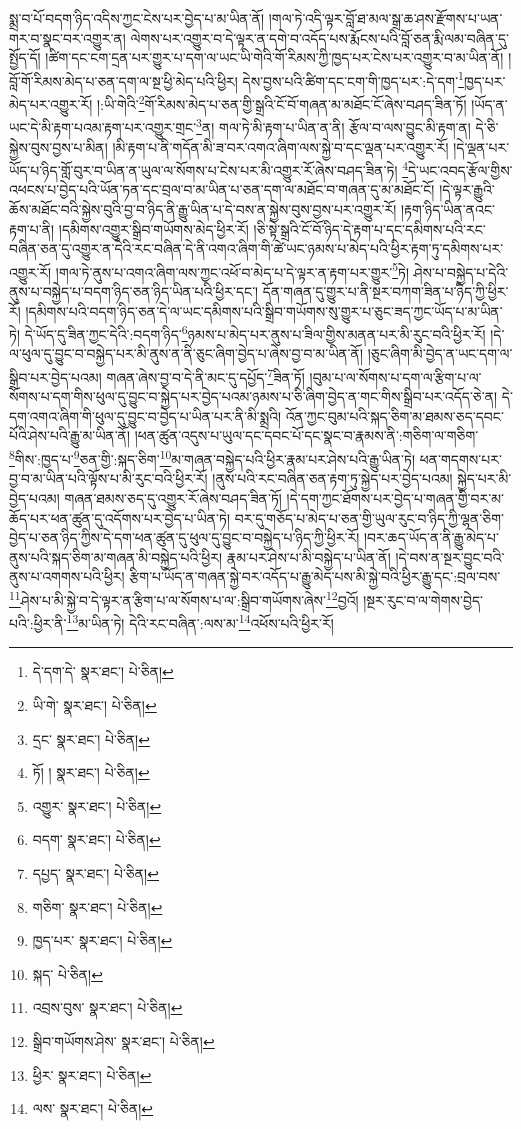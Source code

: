 སྨྲ་བ་པོ་བདག་ཉིད་འདིས་ཀྱང་ངེས་པར་བྱེད་པ་མ་ཡིན་ནོ། །གལ་ཏེ་འདི་ལྟར་བློ་ཐ་མལ་སྒྲ་ཆ་ཤས་རྫོགས་པ་ཡན་གར་བ་སྣང་བར་འགྱུར་ན། ལེགས་པར་འགྱུར་བ་དེ་ལྟར་ན་དགེ་བ་འདོད་པས་རྨོངས་པའི་བློ་ཅན་རྨི་ལམ་བཞིན་དུ་སྤྱོད་དོ། །ཚིག་དང་ངག་དྲན་པར་གྱུར་པ་དག་ལ་ཡང་ཡི་གེའི་གོ་རིམས་ཀྱི་ཁྱད་པར་ངེས་པར་འགྱུར་བ་མ་ཡིན་ནོ། །བློ་གོ་རིམས་མེད་པ་ཅན་དག་ལ་སྔ་ཕྱི་མེད་པའི་ཕྱིར། དེས་བྱས་པའི་ཚིག་དང་ངག་གི་ཁྱད་པར་:དེ་དག་\footnote{དེ་དག་དེ་  སྣར་ཐང་།  པེ་ཅིན། }ཁྱད་པར་མེད་པར་འགྱུར་རོ། །:ཡི་གེའི་\footnote{ཡི་གེ་  སྣར་ཐང་།  པེ་ཅིན། }གོ་རིམས་མེད་པ་ཅན་གྱི་སྒྲའི་ངོ་བོ་གཞན་མ་མཐོང་ངོ་ཞེས་བཤད་ཟིན་ཏོ། །ཡོད་ན་ཡང་དེ་མི་རྟག་པའམ་རྟག་པར་འགྱུར་གྲང་\footnote{དྲང་  སྣར་ཐང་།  པེ་ཅིན། }ན། གལ་ཏེ་མི་རྟག་པ་ཡིན་ན་ནི། རྩོལ་བ་ལས་བྱུང་མི་རྟག་ན། དེ་ཅི་སྐྱེས་བུས་བྱས་པ་མིན། །མི་རྟག་པ་ནི་གདོན་མི་ཟ་བར་འགའ་ཞིག་ལས་སྐྱེ་བ་དང་ལྡན་པར་འགྱུར་རོ། །དེ་ལྡན་པར་ཡོད་པ་ཉིད་གློ་བུར་བ་ཡིན་ན་ཡུལ་ལ་སོགས་པ་ངེས་པར་མི་འགྱུར་རོ་ཞེས་བཤད་ཟིན་ཏེ། \footnote{ཏོ། །   སྣར་ཐང་།  པེ་ཅིན། }དེ་ཡང་འབད་རྩོལ་གྱིས་འཕངས་པ་བྱེད་པའི་ཡོན་ཏན་དང་བྲལ་བ་མ་ཡིན་པ་ཅན་དག་ལ་མཐོང་བ་གཞན་དུ་མ་མཐོང་ངོ། །དེ་ལྟར་རྒྱུའི་ཆོས་མཐོང་བའི་སྐྱེས་བུའི་བྱ་བ་ཉིད་ནི་རྒྱུ་ཡིན་པ་དེ་བས་ན་སྐྱེས་བུས་བྱས་པར་འགྱུར་རོ། །རྟག་ཉིད་ཡིན་ནའང་རྟག་པ་ནི། །དམིགས་འགྱུར་སྒྲིབ་གཡོགས་མེད་ཕྱིར་རོ། །ཅི་སྟེ་སྒྲའི་ངོ་བོ་ཉིད་དེ་རྟག་པ་དང་དམིགས་པའི་རང་བཞིན་ཅན་དུ་འགྱུར་ན་དེའི་རང་བཞིན་དེ་ནི་འགའ་ཞིག་གི་ཚེ་ཡང་ཉམས་པ་མེད་པའི་ཕྱིར་རྟག་ཏུ་དམིགས་པར་འགྱུར་རོ། །གལ་ཏེ་ནུས་པ་འགའ་ཞིག་ལས་ཀྱང་འཕོ་བ་མེད་པ་དེ་ལྟར་ན་རྟག་པར་གྱུར་\footnote{འགྱུར་  སྣར་ཐང་།  པེ་ཅིན། }ཏེ། ཤེས་པ་བསྐྱེད་པ་དེའི་ནུས་པ་བསྐྱེད་པ་བདག་ཉིད་ཅན་ཉིད་ཡིན་པའི་ཕྱིར་དང་། དོན་གཞན་དུ་གྱུར་པ་ནི་སྔར་བཀག་ཟིན་པ་ཉིད་ཀྱི་ཕྱིར་རོ། །དམིགས་པའི་བདག་ཉིད་ཅན་དེ་ལ་ཡང་དམིགས་པའི་སྒྲིབ་གཡོགས་སུ་གྱུར་པ་ཅུང་ཟད་ཀྱང་ཡོད་པ་མ་ཡིན་ཏེ། དེ་ཡོད་དུ་ཟིན་ཀྱང་དེའི་:བདག་ཉིད་\footnote{བདག་  སྣར་ཐང་།  པེ་ཅིན། }ཉམས་པ་མེད་པར་ནུས་པ་ཟིལ་གྱིས་མནན་པར་མི་རུང་བའི་ཕྱིར་རོ། །དེ་ལ་ཕུལ་དུ་བྱུང་བ་བསྐྱེད་པར་མི་ནུས་ན་ནི་ཅུང་ཞིག་བྱེད་པ་ཞེས་བྱ་བ་མ་ཡིན་ནོ། །ཅུང་ཞིག་མི་བྱེད་ན་ཡང་དག་ལ་སྒྲིབ་པར་བྱེད་པའམ། གཞན་ཞེས་བྱ་བ་དེ་ནི་མང་དུ་དཔྱོད་\footnote{དཔྱད་  སྣར་ཐང་།  པེ་ཅིན། }ཟིན་ཏོ། །བུམ་པ་ལ་སོགས་པ་དག་ལ་རྩིག་པ་ལ་སོགས་པ་དག་གིས་ཕུལ་དུ་བྱུང་བ་སྐྱེད་པར་བྱེད་པའམ་ཉམས་པ་ཅི་ཞིག་བྱེད་ན་གང་གིས་སྒྲིབ་པར་འདོད་ཅེ་ན། དེ་དག་འགའ་ཞིག་གི་ཕུལ་དུ་བྱུང་བ་བྱེད་པ་ཡིན་པར་ནི་མི་སྨྲའི། འོན་ཀྱང་བུམ་པའི་སྐད་ཅིག་མ་ཐམས་ཅད་དབང་པོའི་ཤེས་པའི་རྒྱུ་མ་ཡིན་ནོ། །ཕན་ཚུན་འདུས་པ་ཡུལ་དང་དབང་པོ་དང་སྣང་བ་རྣམས་ནི་:གཅིག་ལ་གཅིག་\footnote{གཅིག་  སྣར་ཐང་།  པེ་ཅིན། }གིས་:ཁྱད་པ་\footnote{ཁྱད་པར་  སྣར་ཐང་།  པེ་ཅིན། }ཅན་གྱི་:སྐད་ཅིག་\footnote{སྐད་  པེ་ཅིན། }མ་གཞན་བསྐྱེད་པའི་ཕྱིར་རྣམ་པར་ཤེས་པའི་རྒྱུ་ཡིན་ཏེ། ཕན་གདགས་པར་བྱ་བ་མ་ཡིན་པའི་ལྟོས་པ་མི་རུང་བའི་ཕྱིར་རོ། །ནུས་པའི་རང་བཞིན་ཅན་རྟག་ཏུ་སྐྱེད་པར་བྱེད་པའམ། སྐྱེད་པར་མི་བྱེད་པའམ། གཞན་ཐམས་ཅད་དུ་འགྱུར་རོ་ཞེས་བཤད་ཟིན་ཏོ། །དེ་དག་ཀྱང་ཐོགས་པར་བྱེད་པ་གཞན་གྱི་བར་མ་ཆོད་པར་ཕན་ཚུན་དུ་འདོགས་པར་བྱེད་པ་ཡིན་ཏེ། བར་དུ་གཅོད་པ་མེད་པ་ཅན་གྱི་ཡུལ་རུང་བ་ཉིད་ཀྱི་ལྷན་ཅིག་བྱེད་པ་ཅན་ཉིད་ཀྱིས་དེ་དག་ཕན་ཚུན་དུ་ཕུལ་དུ་བྱུང་བ་བསྐྱེད་པ་ཉིད་ཀྱི་ཕྱིར་རོ། །བར་ཆད་ཡོད་ན་ནི་རྒྱུ་མེད་པ་ནུས་པའི་སྐད་ཅིག་མ་གཞན་མི་བསྐྱེད་པའི་ཕྱིར། རྣམ་པར་ཤེས་པ་མི་བསྐྱེད་པ་ཡིན་ནོ། །དེ་བས་ན་སྔར་བྱུང་བའི་ནུས་པ་འགགས་པའི་ཕྱིར། རྩིག་པ་ཡོད་ན་གཞན་སྐྱེ་བར་འདོད་པ་རྒྱུ་མེད་པས་མི་སྐྱེ་བའི་ཕྱིར་རྒྱུ་དང་:བྲལ་བས་\footnote{འབྲས་བུས་  སྣར་ཐང་།  པེ་ཅིན། }ཤེས་པ་མི་སྐྱེ་བ་དེ་ལྟར་ན་རྩིག་པ་ལ་སོགས་པ་ལ་:སྒྲིབ་གཡོགས་ཞེས་\footnote{སྒྲིབ་གཡོགས་ཤེས་  སྣར་ཐང་།  པེ་ཅིན། }བྱའོ། །སྔར་རུང་བ་ལ་གེགས་བྱེད་པའི་:ཕྱིར་ནི་\footnote{ཕྱིར་  སྣར་ཐང་།  པེ་ཅིན། }མ་ཡིན་ཏེ། དེའི་རང་བཞིན་:ལས་མ་\footnote{ལས་  སྣར་ཐང་།  པེ་ཅིན། }འཕོས་པའི་ཕྱིར་རོ། 